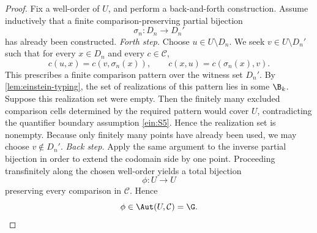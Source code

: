 \begin{proof}
	Fix a well-order of \(U\), and perform a back-and-forth construction.
	Assume inductively that a finite comparison-preserving partial bijection
	\[
		\sigma_n:D_n\to D_n'
	\]
	has already been constructed.
	\smallskip
	\noindent
	\emph{Forth step.}
	Choose \(u\in U\setminus D_n\).
	We seek \(v\in U\setminus D_n'\) such that for every \(x\in D_n\) and
	every \(c\in\mathcal C\),
	\[
		c(u,x)=c(v,\sigma_n(x)),
		\qquad
		c(x,u)=c(\sigma_n(x),v).
	\]
	This prescribes a finite comparison pattern over the witness set
	\(D_n'\).
	By \cref{lem:einstein-typing}, the set of realizations of this pattern
	lies in some \(\B_k\).
	Suppose this realization set were empty.
	Then the finitely many excluded comparison cells determined by the
	required pattern would cover \(U\), contradicting the quantifier
	boundary assumption \ref{ein:S5}.
	Hence the realization set is nonempty.
	Because only finitely many points have already been used, we may choose
	\(v\notin D_n'\).
	\smallskip
	\noindent
	\emph{Back step.}
	Apply the same argument to the inverse partial bijection in order to
	extend the codomain side by one point.
	\smallskip
	Proceeding transfinitely along the chosen well-order yields a total
	bijection
	\[
		\phi:U\to U
	\]
	preserving every comparison in \(\mathcal C\).
	Hence
	\[
		\phi\in\Aut(U,\mathcal C)=\G.
	\]
\end{proof}
